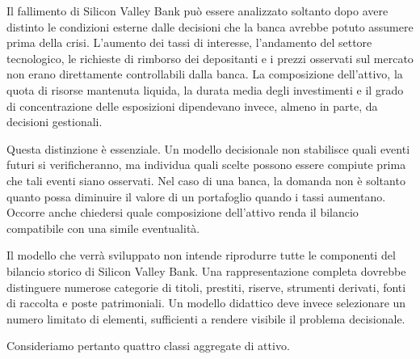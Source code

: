 Il fallimento di Silicon Valley Bank pu\`o essere analizzato soltanto dopo
avere distinto le condizioni esterne dalle decisioni che la banca avrebbe
potuto assumere prima della crisi. L'aumento dei tassi di interesse,
l'andamento del settore tecnologico, le richieste di rimborso dei depositanti
e i prezzi osservati sul mercato non erano direttamente controllabili dalla
banca. La composizione dell'attivo, la quota di risorse mantenuta liquida, la
durata media degli investimenti e il grado di concentrazione delle esposizioni
dipendevano invece, almeno in parte, da decisioni gestionali.

Questa distinzione \`e essenziale. Un modello decisionale non stabilisce quali
eventi futuri si verificheranno, ma individua quali scelte possono essere
compiute prima che tali eventi siano osservati. Nel caso di una banca, la
domanda non \`e soltanto quanto possa diminuire il valore di un portafoglio
quando i tassi aumentano. Occorre anche chiedersi quale composizione
dell'attivo renda il bilancio compatibile con una simile eventualit\`a.

Il modello che verr\`a sviluppato non intende riprodurre tutte le componenti
del bilancio storico di Silicon Valley Bank. Una rappresentazione completa
dovrebbe distinguere numerose categorie di titoli, prestiti, riserve,
strumenti derivati, fonti di raccolta e poste patrimoniali. Un modello
didattico deve invece selezionare un numero limitato di elementi, sufficienti
a rendere visibile il problema decisionale.

Consideriamo pertanto quattro classi aggregate di attivo.

